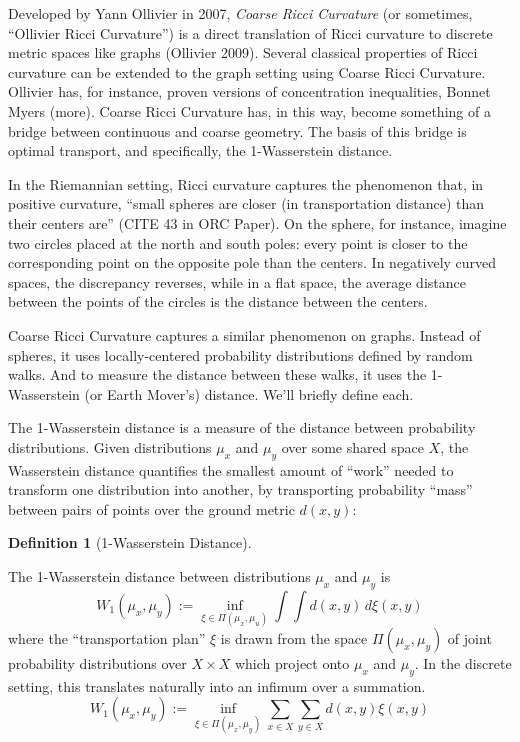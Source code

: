 \documentclass[
  letterpaper,
  DIV=11,
  numbers=noendperiod]{scrartcl}
\theoremstyle{plain}
\theoremstyle{plain}
\theoremstyle{definition}
\theoremstyle{definition}
\newtheorem{definition}{Definition}[section]
\theoremstyle{remark}
\begin{document}
Developed by Yann Ollivier in 2007, \emph{Coarse Ricci Curvature} (or
sometimes, ``Ollivier Ricci Curvature'') is a direct translation of
Ricci curvature to discrete metric spaces like graphs (Ollivier 2009).
Several classical properties of Ricci curvature can be extended to the
graph setting using Coarse Ricci Curvature. Ollivier has, for instance,
proven versions of concentration inequalities, Bonnet Myers (more).
Coarse Ricci Curvature has, in this way, become something of a bridge
between continuous and coarse geometry. The basis of this bridge is
optimal transport, and specifically, the 1-Wasserstein distance.

In the Riemannian setting, Ricci curvature captures the phenomenon that,
in positive curvature, ``small spheres are closer (in transportation
distance) than their centers are'' (CITE 43 in ORC Paper). On the
sphere, for instance, imagine two circles placed at the north and south
poles: every point is closer to the corresponding point on the opposite
pole than the centers. In negatively curved spaces, the discrepancy
reverses, while in a flat space, the average distance between the points
of the circles is the distance between the centers.

Coarse Ricci Curvature captures a similar phenomenon on graphs. Instead
of spheres, it uses locally-centered probability distributions defined
by random walks. And to measure the distance between these walks, it
uses the 1-Wasserstein (or Earth Mover's) distance. We'll briefly define
each.

The 1-Wasserstein distance is a measure of the distance between
probability distributions. Given distributions \(\mu_{x}\) and
\(\mu_{y}\) over some shared space \(X\), the Wasserstein distance
quantifies the smallest amount of ``work'' needed to transform one
distribution into another, by transporting probability ``mass'' between
pairs of points over the ground metric \(d(x,y)\):

\begin{definition}[1-Wasserstein
Distance]\protect\hypertarget{def-1-wasserstein}{}\label{def-1-wasserstein}

The 1-Wasserstein distance between distributions \(\mu_{x}\) and
\(\mu_{y}\) is
\[ W_{1}(\mu_{x},\mu_{y}) := \inf_{\xi \in \Pi(\mu_{x},\mu_{u})} \int \int d(x,y) \, d\xi(x,y) \]
where the ``transportation plan'' \(\xi\) is drawn from the space
\(\Pi(\mu_{x},\mu_{y})\) of joint probability distributions over
\(X \times X\) which project onto \(\mu_{x}\) and \(\mu_{y}\). In the
discrete setting, this translates naturally into an infimum over a
summation.
\[W_{1}(\mu_{x},\mu_{y}) := \inf_{\xi \in \Pi(\mu_{x},\mu_{y})} \sum_{x \in X} \sum_{y \in X} d(x,y) \xi(x,y)\]

\end{definition}
\end{document}

